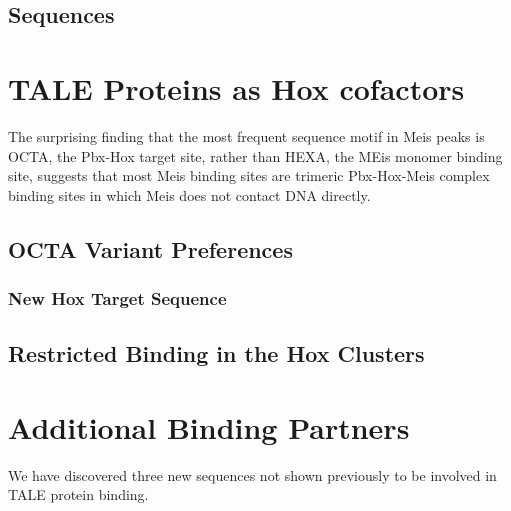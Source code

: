 
\subsection{Sequences}



\section{TALE Proteins as Hox cofactors}

The surprising finding that the most frequent sequence motif in Meis peaks is \ac{OCTA}, the Pbx-Hox target site, rather than \ac{HEXA}, the MEis monomer binding site, suggests that most Meis binding sites are trimeric Pbx-Hox-Meis complex binding sites in which Meis does not contact DNA directly. 

\subsection{OCTA Variant Preferences}



\subsubsection{New Hox Target Sequence}

\subsection{Restricted Binding in the Hox Clusters}



\section{Additional Binding Partners}

We have discovered three new sequences not shown previously to be involved in \ac{TALE} protein binding. 

